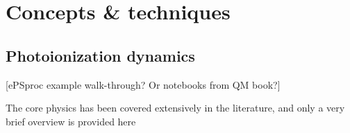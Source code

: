 \section{Concepts \& techniques}

\subsection{Photoionization dynamics} 
[ePSproc example walk-through? Or notebooks from QM book?]

The core physics has been covered extensively in the literature, and only a very brief overview is provided here